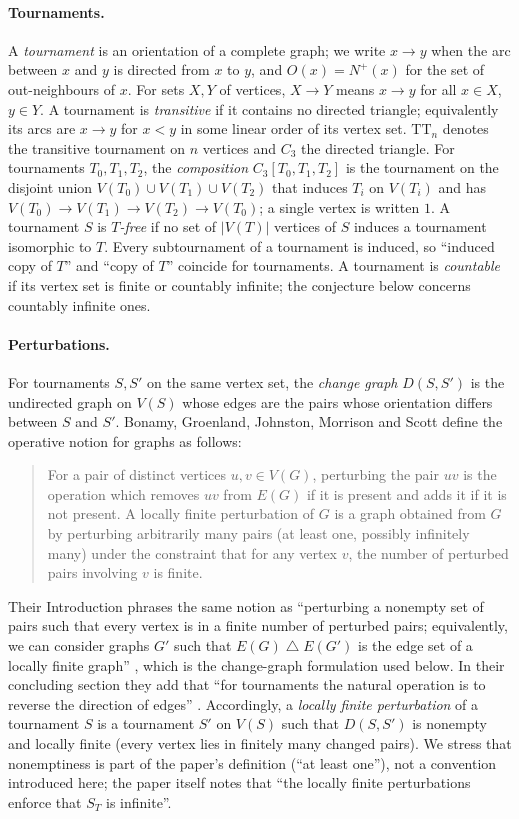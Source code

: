 \documentclass[11pt,a4paper]{article}
\theoremstyle{plain}
\theoremstyle{definition}
\theoremstyle{remark}
\newcommand{\TT}{\mathrm{TT}}
\newcommand{\symdiff}{\mathbin{\triangle}}
\begin{document}
\paragraph{Tournaments.}
A \emph{tournament} is an orientation of a complete graph; we write $x\to y$ when the arc between $x$ and $y$ is directed from $x$ to $y$, and $O(x)=N^+(x)$ for the set of out-neighbours of $x$. For sets $X,Y$ of vertices, $X\to Y$ means $x\to y$ for all $x\in X$, $y\in Y$. A tournament is \emph{transitive} if it contains no directed triangle; equivalently its arcs are $x\to y$ for $x<y$ in some linear order of its vertex set. $\TT_n$ denotes the transitive tournament on $n$ vertices and $C_3$ the directed triangle. For tournaments $T_0,T_1,T_2$, the \emph{composition} $C_3[T_0,T_1,T_2]$ is the tournament on the disjoint union $V(T_0)\cup V(T_1)\cup V(T_2)$ that induces $T_i$ on $V(T_i)$ and has $V(T_0)\to V(T_1)\to V(T_2)\to V(T_0)$; a single vertex is written $1$. A tournament $S$ is \emph{$T$-free} if no set of $|V(T)|$ vertices of $S$ induces a tournament isomorphic to $T$. Every subtournament of a tournament is induced, so ``induced copy of $T$'' and ``copy of $T$'' coincide for tournaments. A tournament is \emph{countable} if its vertex set is finite or countably infinite; the conjecture below concerns countably infinite ones.

\paragraph{Perturbations.}
For tournaments $S,S'$ on the same vertex set, the \emph{change graph} $D(S,S')$ is the undirected graph on $V(S)$ whose edges are the pairs whose orientation differs between $S$ and $S'$. Bonamy, Groenland, Johnston, Morrison and Scott \cite[Section~3]{BGJMS25} define the operative notion for graphs as follows:
\begin{quote}\small
For a pair of distinct vertices $u,v\in V(G)$, perturbing the pair $uv$ is the operation which removes $uv$ from $E(G)$ if it is present and adds it if it is not present. A locally finite perturbation of $G$ is a graph obtained from $G$ by perturbing arbitrarily many pairs (at least one, possibly infinitely many) under the constraint that for any vertex $v$, the number of perturbed pairs involving $v$ is finite.
\end{quote}
Their Introduction phrases the same notion as ``perturbing a nonempty set of pairs such that every vertex is in a finite number of perturbed pairs; equivalently, we can consider graphs $G'$ such that $E(G)\symdiff E(G')$ is the edge set of a locally finite graph'' \cite[Section~1]{BGJMS25}, which is the change-graph formulation used below. In their concluding section they add that ``for tournaments the natural operation is to reverse the direction of edges'' \cite[Section~8]{BGJMS25}. Accordingly, a \emph{locally finite perturbation} of a tournament $S$ is a tournament $S'$ on $V(S)$ such that $D(S,S')$ is nonempty and locally finite (every vertex lies in finitely many changed pairs). We stress that nonemptiness is part of the paper's definition (``at least one''), not a convention introduced here; the paper itself notes that ``the locally finite perturbations enforce that $S_T$ is infinite''.
\end{document}
